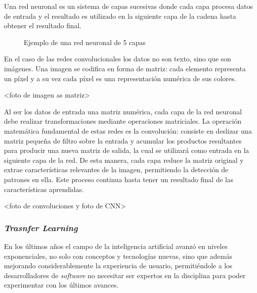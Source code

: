 \documentclass[a4paper]{article}
\begin{document}
Una red neuronal es un sistema de capas sucesivas donde cada capa procesa datos de entrada y el resultado es utilizado en la siguiente capa de la cadena hasta obtener el resultado final.

\begin{figure}[H]
\caption{Ejemplo de una red neuronal de 5 capas}
\end{figure}


En el caso de las redes convolucionales los datos no son texto, sino que son imágenes.
Una imagen se codifica en forma de matriz: cada elemento representa un píxel y a su vez cada píxel es una representación numérica de sus colores.

<foto de imagen as matriz>

Al ser los datos de entrada una matriz numérica, cada capa de la red neuronal debe realizar transformaciones mediante operaciones matriciales. La operación matemática fundamental de estas redes es la convolución: consiste en deslizar una matriz pequeña de filtro sobre la entrada y acumular los productos resultantes para producir una nueva matriz de salida, la cual se utilizará como entrada en la siguiente capa de la red. De esta manera, cada capa reduce la matriz original y extrae características relevantes de la imagen, permitiendo la detección de patrones en ella. Este proceso continua hasta tener un resultado final de las características aprendidas.

<foto de convoluciones y foto de CNN>

\subsubsection{\textit{Trasnfer Learning}}

En los últimos años el campo de la inteligencia artificial avanzó en niveles exponenciales, no solo con conceptos y tecnologías nuevas, sino que además mejorando considerablemente la experiencia de usuario, permitiéndole a los desarrolladores de \textit{software} no necesitar ser expertos en la disciplina para poder experimentar con los últimos avances.
\end{document}
